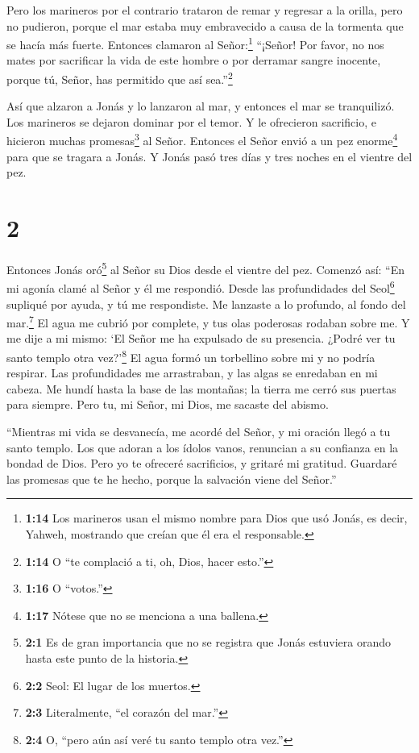  Pero los marineros por el contrario trataron de remar y
regresar a la orilla, pero no pudieron, porque el mar estaba muy
embravecido a causa de la tormenta que se hacía más fuerte.
 Entonces clamaron al Señor:\footnote{\textbf{1:14} Los
  marineros usan el mismo nombre para Dios que usó Jonás, es decir,
  Yahweh, mostrando que creían que él era el responsable.} ``¡Señor! Por
favor, no nos mates por sacrificar la vida de este hombre o por derramar
sangre inocente, porque tú, Señor, has permitido que así
sea.''\footnote{\textbf{1:14} O ``te complació a ti, oh, Dios, hacer
  esto.''}

 Así que alzaron a Jonás y lo lanzaron al mar, y entonces
el mar se tranquilizó.  Los marineros se dejaron dominar
por el temor. Y le ofrecieron sacrificio, e hicieron muchas
promesas\footnote{\textbf{1:16} O ``votos.''} al Señor. 
Entonces el Señor envió a un pez enorme\footnote{\textbf{1:17} Nótese
  que no se menciona a una ballena.} para que se tragara a Jonás. Y
Jonás pasó tres días y tres noches en el vientre del pez.

\hypertarget{section-1}{%
\section{2}\label{section-1}}

 Entonces Jonás oró\footnote{\textbf{2:1} Es de gran
  importancia que no se registra que Jonás estuviera orando hasta este
  punto de la historia.} al Señor su Dios desde el vientre del pez.
 Comenzó así: ``En mi agonía clamé al Señor y él me
respondió. Desde las profundidades del Seol\footnote{\textbf{2:2} Seol:
  El lugar de los muertos.} supliqué por ayuda, y tú me respondiste.
 Me lanzaste a lo profundo, al fondo del mar.\footnote{\textbf{2:3}
  Literalmente, ``el corazón del mar.''} El agua me cubrió por complete,
y tus olas poderosas rodaban sobre me.  Y me dije a mi
mismo: `El Señor me ha expulsado de su presencia. ¿Podré ver tu santo
templo otra vez?'\footnote{\textbf{2:4} O, ``pero aún así veré tu santo
  templo otra vez.''}  El agua formó un torbellino sobre mi
y no podría respirar. Las profundidades me arrastraban, y las algas se
enredaban en mi cabeza.  Me hundí hasta la base de las
montañas; la tierra me cerró sus puertas para siempre. Pero tu, mi
Señor, mi Dios, me sacaste del abismo.

 ``Mientras mi vida se desvanecía, me acordé del Señor, y mi
oración llegó a tu santo templo.  Los que adoran a los
ídolos vanos, renuncian a su confianza en la bondad de Dios.
 Pero yo te ofreceré sacrificios, y gritaré mi gratitud.
Guardaré las promesas que te he hecho, porque la salvación viene del
Señor.''

